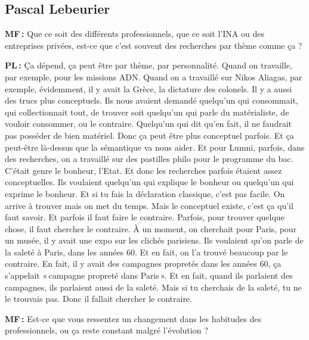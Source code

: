 \subsection*{Pascal Lebeurier }

\textbf{MF :} Que ce soit des différents professionnels, que ce soit l'INA ou des entreprises privées, est-ce que c'est souvent des recherches par thème comme ça ? 

\textbf{PL :} Ça dépend, ça peut être par thème, par personnalité. Quand on travaille, par exemple, pour les missions ADN. Quand on a travaillé sur Nikos Aliagas, par exemple, évidemment, il y avait la Grèce, la dictature des colonels. Il y a aussi des trucs plus conceptuels. Ils nous avaient demandé quelqu'un qui consommait, qui collectionnait tout, de trouver soit quelqu'un qui parle du matérialiste, de vouloir consommer, ou le contraire. Quelqu'un qui dit qu'en fait, il ne faudrait pas posséder de bien matériel. Donc ça peut être plus conceptuel parfois. Et ça peut-être là-dessus que la sémantique va nous aider. Et pour Lumni, parfois, dans des recherches, on a travaillé sur des pastilles philo pour le programme du bac. C'était genre le bonheur, l'Etat. Et donc les recherches parfois étaient assez conceptuelles. Ils voulaient quelqu'un qui explique le bonheur ou quelqu'un qui exprime le bonheur. Et si tu fais la déclaration classique, c'est pas facile. On arrive à trouver mais on met du temps. Mais le conceptuel existe, c'est ça qu'il faut savoir.  Et parfois il faut faire le contraire.  Parfois, pour trouver quelque chose, il faut chercher le contraire. À un moment, on cherchait pour Paris, pour un musée, il y avait une expo sur les clichés parisiens. Ils voulaient qu'on parle de la saleté à Paris, dans les années 60. Et en fait, on l'a trouvé beaucoup par le contraire. En fait, il y avait des campagnes propretés dans les années 60, ça s'appelait « campagne propreté dans Paris ». Et en fait, quand ils parlaient des campagnes, ils parlaient aussi de la saleté. Mais si tu cherchais de la saleté, tu ne le trouvais pas. Donc il fallait chercher le contraire. 

\textbf{MF :} Est-ce que vous ressentez un changement dans les habitudes des professionnels, ou ça reste constant malgré l'évolution ? 


